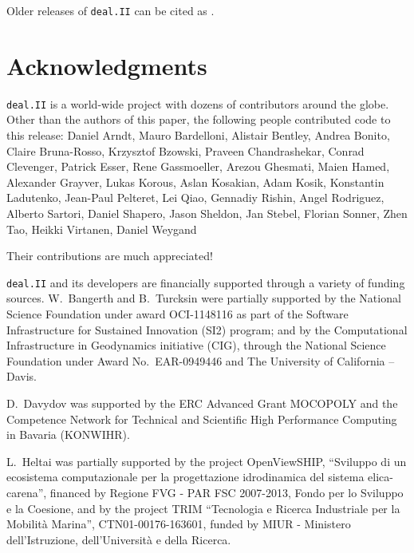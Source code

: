 \documentclass{ansarticle-preprint}
\newcommand{\specialword}[1]{\texttt{#1}}
\newcommand{\dealii}{{\specialword{deal.II}}}
\begin{document}
Older releases of \dealii{} can be cited as \cite{dealII80,dealII81,dealII82,dealII83}.

\nocite{BangerthKanschat1999}

\section{Acknowledgments}

\dealii{} is a world-wide project with dozens of contributors around the
globe. Other than the authors of this paper, the following people contributed code to
this release:
%
%
Daniel Arndt,
Mauro Bardelloni,
Alistair Bentley,
Andrea Bonito,
Claire Bruna-Rosso,
Krzysztof Bzowski,
Praveen Chandrashekar,
Conrad Clevenger,
Patrick Esser,
Rene Gassmoeller,
Arezou Ghesmati,
Maien Hamed,
Alexander Grayver,
Lukas Korous,
Aslan Kosakian,
Adam Kosik,
Konstantin Ladutenko,
Jean-Paul Pelteret,
Lei Qiao,
Gennadiy Rishin,
Angel Rodriguez,
Alberto Sartori,
Daniel Shapero,
Jason Sheldon,
Jan Stebel,
Florian Sonner,
Zhen Tao,
Heikki Virtanen,
Daniel Weygand


Their contributions are much appreciated!


\dealii{} and its developers are financially supported through a
variety of funding sources. W.~Bangerth and B.~Turcksin were partially
supported by the National Science Foundation under award OCI-1148116
as part of the Software Infrastructure for Sustained Innovation (SI2)
program; and by the Computational Infrastructure in Geodynamics initiative
(CIG), through the National Science Foundation under Award
No.~EAR-0949446 and The University of California -- Davis.

D.~Davydov was supported by the ERC Advanced Grant MOCOPOLY and the Competence Network for Technical and Scientific High Performance Computing in Bavaria (KONWIHR).

L.~Heltai was partially supported by the project OpenViewSHIP,
``Sviluppo di un ecosistema computazionale per la progettazione
idrodinamica del sistema elica-carena'', financed by Regione FVG - PAR
FSC 2007-2013, Fondo per lo Sviluppo e la Coesione, and by the project
TRIM ``Tecnologia e Ricerca Industriale per la Mobilit\`a Marina'',
CTN01-00176-163601, funded by MIUR -  Ministero dell'Istruzione,
dell'Universit\`a e della Ricerca.
\end{document}
